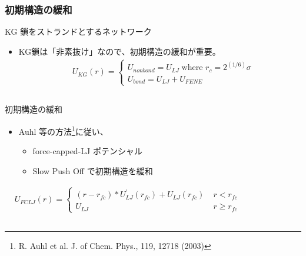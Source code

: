 \documentclass[12pt, dvipdfmx]{beamer}
\begin{document}
\begin{frame}
    \frametitle{初期構造の緩和}
        \vspace{-2mm}
		\begin{block}{KG 鎖をストランドとするネットワーク}
			\begin{itemize}
				\item KG鎖は「非素抜け」なので、\alert{初期構造の緩和}が重要。
					\fontsize{6pt}{0pt}
					\begin{align*}
						&U_{KG}(r) = 
						\begin{cases}
						U_{nonbond} = U_{LJ} \;\text{where } r_c = 2^{(1/6)}\sigma \\
						U_{bond} = U_{LJ} + U_{FENE}
						\end{cases} 
					\end{align*}
			\end{itemize}
		\end{block}
		\vspace{-3mm}
		\begin{columns}[T, onlytextwidth]
				\begin{exampleblock}{初期構造の緩和}
					\begin{itemize}
						\item Auhl 等の方法\footnote{
							\scriptsize{R. Auhl et al. J. of Chem. Phys., 119, 12718 (2003)}
						}に従い、
						\begin{itemize}
							\item force-capped-LJ ポテンシャル
							\item Slow Push Off で初期構造を緩和
						\end{itemize}
					\end{itemize}
					\fontsize{6pt}{0pt}
					\begin{align*}
						&U_{FCLJ}(r) = 
						\begin{cases}
						(r-r_{fc})*U_{LJ}^{\prime}(r_{fc}) + U_{LJ}(r_{fc}) \; &r< r_{fc} \\
						U_{LJ}   \;\;\;\;\;\;\; &r \geq r_{fc}
						\end{cases} 
					\end{align*}
				\end{exampleblock}
				\vspace{2mm}
				\begin{center}

\end{center}
\end{columns}
\end{frame}
\end{document}
